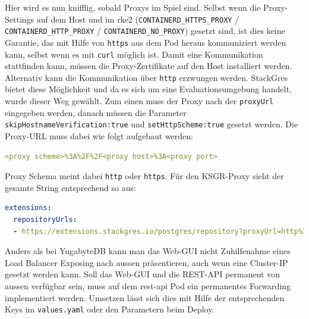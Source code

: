 \begin{flushleft}
    Hier wird es nun knifflig, sobald Proxys im Spiel sind.
    Selbst wenn die Proxy-Settings auf dem Host und im \gls{rke2} (\texttt{CONTAINERD\_HTTPS\_PROXY} / \texttt{CONTAINERD\_HTTP\_PROXY} / \texttt{CONTAINERD\_NO\_PROXY}) gesetzt sind,
    ist dies keine Garantie, das mit Hilfe von \texttt{https} aus dem Pod heraus kommuniziert werden kann, selbst wenn es mit \texttt{curl} möglich ist.
    Damit eine Kommunikation stattfinden kann, müssen die Proxy-Zertifikate auf den Host installiert werden.
    Alternativ kann die Kommunikation über \texttt{http} erzwungen werden.
    StackGres bietet diese Möglichkeit und da es sich um eine Evaluationsumgebung handelt, wurde dieser Weg gewählt.
    Zum einen muss der Proxy nach der \texttt{proxyUrl} eingegeben werden, danach müssen die Parameter \texttt{skipHostnameVerification:true} und \texttt{setHttpScheme:true} gesetzt werden.
    Die Proxy-URL muss dabei wie folgt aufgebaut werden:
\lstset{style=gra_codestyle}
\begin{lstlisting}[language=yaml, caption=StackGres - values.yaml - Extension proxyUrl,captionpos=b,label={lst:stackgres_extension_proxyurl},breaklines=true]
<proxy scheme>%3A%2F%2F<proxy host>%3A<proxy port>
\end{lstlisting}
    Proxy Schema meint dabei \texttt{http} oder \texttt{https}.
    Für den KSGR-Proxy sieht der gesamte String entsprechend so aus:
\lstset{style=gra_codestyle}
\begin{lstlisting}[language=yaml, caption=StackGres - values.yaml - Extension Proxy,captionpos=b,label={lst:stackgres_extension_proxy},breaklines=true]
extensions:
  repositoryUrls:
  - https://extensions.stackgres.io/postgres/repository?proxyUrl=http%3A%2F%2Fsproxy.sivc.first-it.ch%3A8080?skipHostnameVerification:true&setHttpScheme:true
\end{lstlisting}
\end{flushleft}
\begin{flushleft}
    Anders als bei YugabyteDB kann man das Web-GUI nicht Zuhilfenahme eines Load Balancer Exposing nach aussen präsentieren, auch wenn eine Cluster-IP gesetzt werden kann.
    Soll das Web-GUI und die REST-API permanent von aussen verfügbar sein, muss auf dem rest-api Pod ein permanentes Forwarding implementiert werden.
    Umsetzen lässt sich dies mit Hilfe der entsprechenden Keys im \texttt{values.yaml} oder den Parametern beim Deploy.
\end{flushleft}
